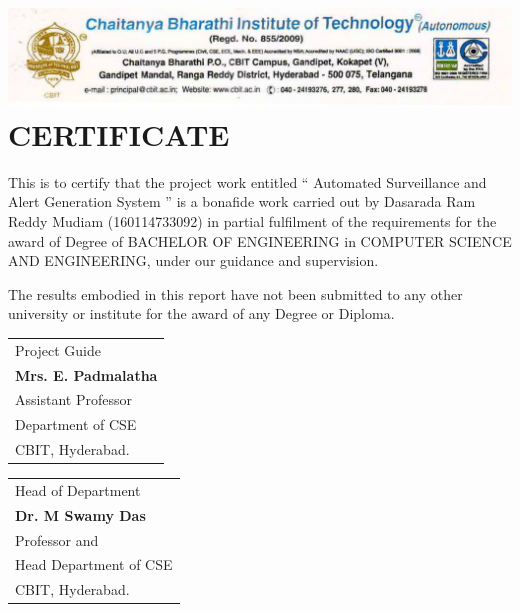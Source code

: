 \cleardoublepage
{}
{}

\chapter*{\includegraphics[width=1\textwidth]{./certi} CERTIFICATE}

\normalsize This is to certify that the project work entitled “ Automated Surveillance and Alert Generation System ” is a bonafide work carried out by Dasarada Ram Reddy Mudiam (160114733092) in partial fulfilment of the requirements for the award of Degree of BACHELOR OF ENGINEERING in COMPUTER SCIENCE AND ENGINEERING, under our guidance and supervision.

The results embodied in this report have not been submitted to any other university or institute for the award of any Degree or Diploma.\\[1.0cm]

\vfill\noindent
\begin{tabular}[t]{@{}l} 
  Project Guide\\ \textbf{Mrs. E. Padmalatha}\\ Assistant Professor\\ Department of CSE\\ CBIT, Hyderabad.
\end{tabular}
\hfill%
\begin{tabular}[t]{l@{}}
   Head of Department\\ \textbf{Dr. M Swamy Das}\\ Professor and \\Head Department of CSE\\ CBIT, Hyderabad.
\end{tabular}